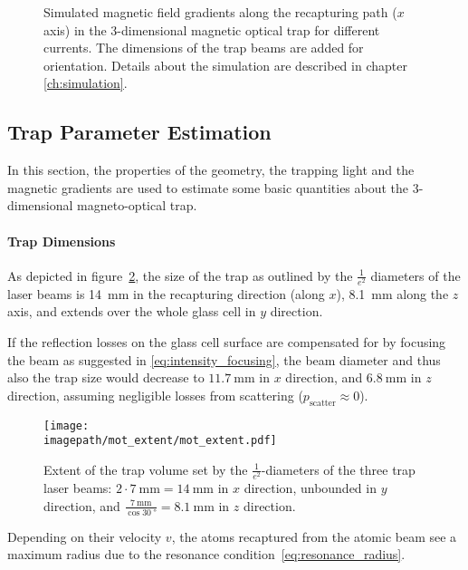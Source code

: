 \begin{figure}
    \centering
    \caption{Simulated magnetic field gradients along the recapturing path ($x$ axis) in the 3-dimensional magnetic optical trap for different currents. The dimensions of the trap beams are added for orientation. Details about the simulation are described in chapter \ref{ch:simulation}.
    }
    \label{fig:mot_gradient}
\end{figure}




\subsection*{Trap Parameter Estimation}
In this section, the properties of the geometry, the trapping light and the magnetic gradients are used to estimate some basic quantities about the 3-dimensional magneto-optical trap.

\paragraph{Trap Dimensions}
As depicted in figure~\ref{fig:mot_extent}, the size of the trap as outlined by the $\frac{1}{e^2}$ diameters of the laser beams is \SI[]{14}{\milli\meter} in the recapturing direction (along $x$), \SI[]{8.1}{\milli\meter} along the $z$ axis, and extends over the whole glass cell in $y$ direction.

If the reflection losses on the glass cell surface are compensated for by focusing the beam as suggested in \eqref{eq:intensity_focusing}, the beam diameter and thus also the trap size would decrease to $\SI[]{11.7}{\milli\meter}$ in $x$ direction, and $\SI[]{6.8}{\milli\meter}$ in $z$ direction, assuming negligible losses from scattering ($p_\text{scatter} \approx 0$).

\begin{figure}
    \centering
    \texttt{[image: \\imagepath/mot\_extent/mot\_extent.pdf]}
    \caption{Extent of the trap volume set by the $\frac{1}{e^2}$-diameters of the three trap laser beams: $2\cdot \SI[]{7}{\milli\meter} = \SI[]{14}{\milli\meter}$ in $x$ direction, unbounded in $y$ direction, and $\frac{\SI[]{7}{\milli\meter}}{\cos \SI[]{30}{\degree}} = \SI[]{8.1}{\milli\meter}$ in $z$ direction.
    }
    \label{fig:mot_extent}
\end{figure}

Depending on their velocity $v$, the atoms recaptured from the atomic beam see a maximum radius due to the resonance condition~\eqref{eq:resonance_radius}.

